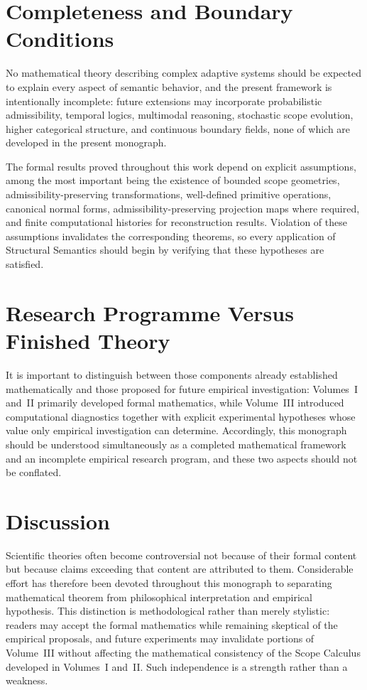 \documentclass[11pt,twoside,openright]{book}
\numberwithin{equation}{chapter}
\theoremstyle{definition}
\theoremstyle{plain}
\theoremstyle{remark}
\theoremstyle{definition}
\begin{document}
\section{Completeness and Boundary Conditions}

No mathematical theory describing complex adaptive systems should be
expected to explain every aspect of semantic behavior, and the present
framework is intentionally incomplete: future extensions may incorporate
probabilistic admissibility, temporal logics, multimodal reasoning,
stochastic scope evolution, higher categorical structure, and continuous
boundary fields, none of which are developed in the present monograph.

The formal results proved throughout this work depend on explicit
assumptions, among the most important being the existence of bounded
scope geometries, admissibility-preserving transformations, well-defined
primitive operations, canonical normal forms, admissibility-preserving
projection maps where required, and finite computational histories for
reconstruction results. Violation of these assumptions invalidates the
corresponding theorems, so every application of Structural Semantics
should begin by verifying that these hypotheses are satisfied.

\section{Research Programme Versus Finished Theory}

It is important to distinguish between those components already
established mathematically and those proposed for future empirical
investigation: Volumes~I and~II primarily developed formal mathematics,
while Volume~III introduced computational diagnostics together with
explicit experimental hypotheses whose value only empirical investigation
can determine. Accordingly, this monograph should be understood
simultaneously as a completed mathematical framework and an incomplete
empirical research program, and these two aspects should not be
conflated.

\section{Discussion}

Scientific theories often become controversial not because of their
formal content but because claims exceeding that content are attributed
to them. Considerable effort has therefore been devoted throughout this
monograph to separating mathematical theorem from philosophical
interpretation and empirical hypothesis. This distinction is
methodological rather than merely stylistic: readers may accept the
formal mathematics while remaining skeptical of the empirical proposals,
and future experiments may invalidate portions of Volume~III without
affecting the mathematical consistency of the Scope Calculus developed
in Volumes~I and~II. Such independence is a strength rather than a
weakness.
\end{document}
